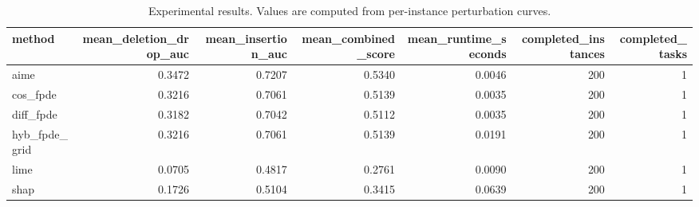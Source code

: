 \begin{table}[t]
\caption{Experimental results. Values are computed from per-instance perturbation curves.}
\label{tab:main_results_computed}
\centering
\begin{tabular}{lrrrrrr}
\toprule
method & mean\_deletion\_drop\_auc & mean\_insertion\_auc & mean\_combined\_score & mean\_runtime\_seconds & completed\_instances & completed\_tasks \\
\midrule
aime & 0.3472 & 0.7207 & 0.5340 & 0.0046 & 200 & 1 \\
cos\_fpde & 0.3216 & 0.7061 & 0.5139 & 0.0035 & 200 & 1 \\
diff\_fpde & 0.3182 & 0.7042 & 0.5112 & 0.0035 & 200 & 1 \\
hyb\_fpde\_grid & 0.3216 & 0.7061 & 0.5139 & 0.0191 & 200 & 1 \\
lime & 0.0705 & 0.4817 & 0.2761 & 0.0090 & 200 & 1 \\
shap & 0.1726 & 0.5104 & 0.3415 & 0.0639 & 200 & 1 \\
\bottomrule
\end{tabular}

\end{table}
